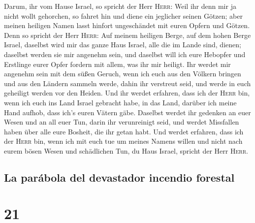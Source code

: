  Darum, ihr vom Hause Israel, so spricht der Herr
\textsc{Herr}: Weil ihr denn mir ja nicht wollt gehorchen, so fahret hin
und diene ein jeglicher seinen Götzen; aber meinen heiligen Namen lasst
hinfort ungeschändet mit euren Opfern und Götzen.  Denn
so spricht der Herr \textsc{Herr}: Auf meinem heiligen Berge, auf dem
hohen Berge Israel, daselbst wird mir das ganze Haus Israel, alle die im
Lande sind, dienen; daselbst werden sie mir angenehm sein, und daselbst
will ich eure Hebopfer und Erstlinge eurer Opfer fordern mit allem, was
ihr mir heiligt.  Ihr werdet mir angenehm sein mit dem
süßen Geruch, wenn ich euch aus den Völkern bringen und aus den Ländern
sammeln werde, dahin ihr verstreut seid, und werde in euch geheiligt
werden vor den Heiden.  Und ihr werdet erfahren, dass ich
der \textsc{Herr} bin, wenn ich euch ins Land Israel gebracht habe, in
das Land, darüber ich meine Hand aufhob, dass ich's euren Vätern gäbe.
 Daselbst werdet ihr gedenken an euer Wesen und an all
euer Tun, darin ihr verunreinigt seid, und werdet Missfallen haben über
alle eure Bosheit, die ihr getan habt.  Und werdet
erfahren, dass ich der \textsc{Herr} bin, wenn ich mit euch tue um
meines Namens willen und nicht nach eurem bösen Wesen und schädlichen
Tun, du Haus Israel, spricht der Herr \textsc{Herr}.

\hypertarget{la-paruxe1bola-del-devastador-incendio-forestal}{%
\subsection{La parábola del devastador incendio
forestal}\label{la-paruxe1bola-del-devastador-incendio-forestal}}

\hypertarget{section-20}{%
\section{21}\label{section-20}}

